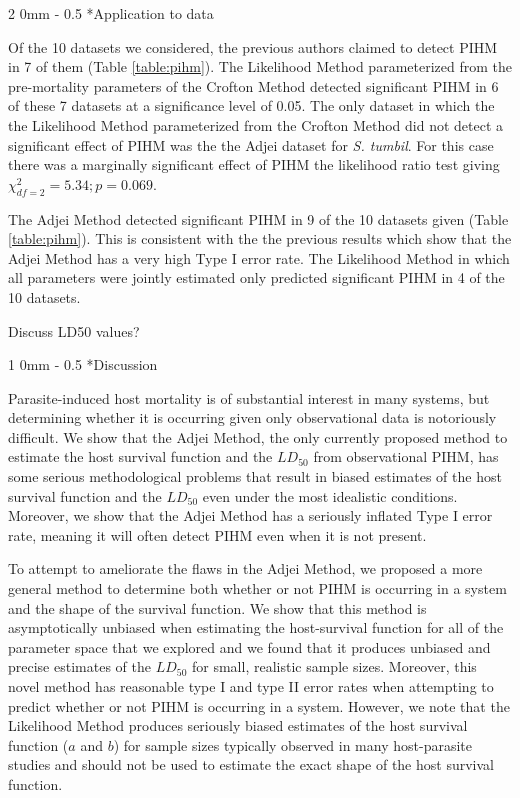 \documentclass[12pt, a4paper]{article}
\makeatletter
\renewcommand{\section}{\@startsection
{section}%
{1}%
{0mm}%
{-\baselineskip}%
{0.5\baselineskip}%
{\normalfont\bf\large}} %
\renewcommand{\subsection}{\@startsection
{subsection}%
{2}%
{0mm}%
{-\baselineskip}%
{0.5\baselineskip}%
{\normalfont\bf}} %
\makeatother
\begin{document}
\subsection*{Application to data}

Of the 10 datasets we considered, the previous authors claimed to detect PIHM
in 7 of them (Table \ref{table:pihm}).  The Likelihood Method parameterized
from the pre-mortality parameters of the Crofton Method detected significant
PIHM in 6 of these 7 datasets at a significance level of 0.05.  The only
dataset in which the the Likelihood Method parameterized from the Crofton
Method did not detect a significant effect of PIHM was the the Adjei dataset
for \emph{S. tumbil}.  For this case there was a marginally significant effect
of PIHM the likelihood ratio test giving $\chi^2_{df=2} = 5.34; p = 0.069$.

The Adjei Method detected significant PIHM in 9 of the 10 datasets given (Table \ref{table:pihm}).  This is consistent with the the previous results which show that the Adjei Method has a very high Type I error rate.  The Likelihood Method in which all parameters were jointly estimated only predicted significant PIHM in 4 of the 10 datasets.


Discuss LD50 values?


\section*{Discussion}

Parasite-induced host mortality is of substantial interest in many systems, but
determining whether it is occurring given only observational data is
notoriously difficult.  We show that the Adjei Method, the only currently
proposed method to estimate the host survival function and the $LD_{50}$ from
observational PIHM, has some serious methodological problems that result in
biased estimates of the host survival function and the $LD_{50}$ even under the most idealistic conditions.  Moreover, we show that the Adjei Method has a seriously inflated Type I error rate, meaning it will often detect PIHM even when it is not present.

To attempt to ameliorate the flaws in the Adjei Method, we proposed a more
general method to determine both whether or not PIHM is occurring in a system
and the shape of the survival function.  We show that this method is
asymptotically unbiased when estimating the host-survival function for all of
the parameter space that we explored and we found that it
produces unbiased and precise estimates of the $LD_{50}$ for small, realistic
sample sizes.  Moreover, this novel method has reasonable type I and type II error rates when attempting to predict whether or not PIHM is occurring in a system.  However, we note that the Likelihood Method produces seriously biased
estimates of the host survival function ($a$ and $b$) for sample sizes typically observed in many host-parasite studies and should not be used to estimate the exact shape of the host survival function.
\end{document}

